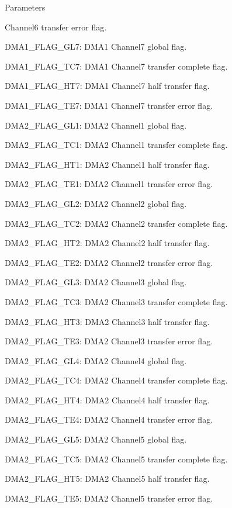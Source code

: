 \begin{DoxyParams}{Parameters}
\begin{DoxyItemize}
Channel6 transfer error flag. \item D\+M\+A1\+\_\+\+F\+L\+A\+G\+\_\+\+G\+L7\+: D\+M\+A1 Channel7 global flag. \item D\+M\+A1\+\_\+\+F\+L\+A\+G\+\_\+\+T\+C7\+: D\+M\+A1 Channel7 transfer complete flag. \item D\+M\+A1\+\_\+\+F\+L\+A\+G\+\_\+\+H\+T7\+: D\+M\+A1 Channel7 half transfer flag. \item D\+M\+A1\+\_\+\+F\+L\+A\+G\+\_\+\+T\+E7\+: D\+M\+A1 Channel7 transfer error flag. \item D\+M\+A2\+\_\+\+F\+L\+A\+G\+\_\+\+G\+L1\+: D\+M\+A2 Channel1 global flag. \item D\+M\+A2\+\_\+\+F\+L\+A\+G\+\_\+\+T\+C1\+: D\+M\+A2 Channel1 transfer complete flag. \item D\+M\+A2\+\_\+\+F\+L\+A\+G\+\_\+\+H\+T1\+: D\+M\+A2 Channel1 half transfer flag. \item D\+M\+A2\+\_\+\+F\+L\+A\+G\+\_\+\+T\+E1\+: D\+M\+A2 Channel1 transfer error flag. \item D\+M\+A2\+\_\+\+F\+L\+A\+G\+\_\+\+G\+L2\+: D\+M\+A2 Channel2 global flag. \item D\+M\+A2\+\_\+\+F\+L\+A\+G\+\_\+\+T\+C2\+: D\+M\+A2 Channel2 transfer complete flag. \item D\+M\+A2\+\_\+\+F\+L\+A\+G\+\_\+\+H\+T2\+: D\+M\+A2 Channel2 half transfer flag. \item D\+M\+A2\+\_\+\+F\+L\+A\+G\+\_\+\+T\+E2\+: D\+M\+A2 Channel2 transfer error flag. \item D\+M\+A2\+\_\+\+F\+L\+A\+G\+\_\+\+G\+L3\+: D\+M\+A2 Channel3 global flag. \item D\+M\+A2\+\_\+\+F\+L\+A\+G\+\_\+\+T\+C3\+: D\+M\+A2 Channel3 transfer complete flag. \item D\+M\+A2\+\_\+\+F\+L\+A\+G\+\_\+\+H\+T3\+: D\+M\+A2 Channel3 half transfer flag. \item D\+M\+A2\+\_\+\+F\+L\+A\+G\+\_\+\+T\+E3\+: D\+M\+A2 Channel3 transfer error flag. \item D\+M\+A2\+\_\+\+F\+L\+A\+G\+\_\+\+G\+L4\+: D\+M\+A2 Channel4 global flag. \item D\+M\+A2\+\_\+\+F\+L\+A\+G\+\_\+\+T\+C4\+: D\+M\+A2 Channel4 transfer complete flag. \item D\+M\+A2\+\_\+\+F\+L\+A\+G\+\_\+\+H\+T4\+: D\+M\+A2 Channel4 half transfer flag. \item D\+M\+A2\+\_\+\+F\+L\+A\+G\+\_\+\+T\+E4\+: D\+M\+A2 Channel4 transfer error flag. \item D\+M\+A2\+\_\+\+F\+L\+A\+G\+\_\+\+G\+L5\+: D\+M\+A2 Channel5 global flag. \item D\+M\+A2\+\_\+\+F\+L\+A\+G\+\_\+\+T\+C5\+: D\+M\+A2 Channel5 transfer complete flag. \item D\+M\+A2\+\_\+\+F\+L\+A\+G\+\_\+\+H\+T5\+: D\+M\+A2 Channel5 half transfer flag. \item D\+M\+A2\+\_\+\+F\+L\+A\+G\+\_\+\+T\+E5\+: D\+M\+A2 Channel5 transfer error flag. \end{DoxyItemize}
\\
\hline
\end{DoxyParams}

